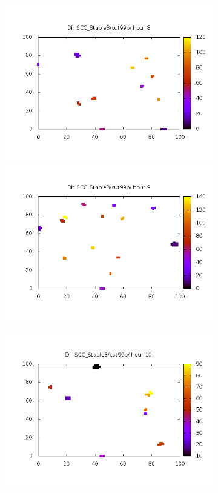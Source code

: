 \documentclass[10pt,a4paper]{article}
\begin{document}
\begin{figure}
\begin{subfigure}[b]{1\textwidth}
\includegraphics[scale=.4]{./img/SCC_Stable3/cut99p/8.png}
\includegraphics[scale=.4]{./img/SCC_Stable3/cut99p/9.png}
\end{subfigure}
\begin{subfigure}[b]{1\textwidth}
\includegraphics[scale=.4]{./img/SCC_Stable3/cut99p/10.png}

\end{subfigure}
\end{figure}
\end{document}
